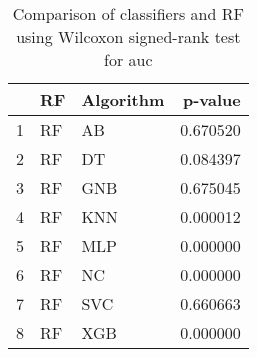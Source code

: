 \begin{table}
\footnotesize
\caption{Comparison of classifiers and RF using Wilcoxon signed-rank test for auc}
\label{tab:RF wilcoxon AUC comparison}
\begin{tabular}{lllr}
\hline
 & RF & Algorithm & p-value \\
\hline
1 & RF & AB & 0.670520 \\
2 & RF & DT & 0.084397 \\
3 & RF & GNB & 0.675045 \\
4 & RF & KNN & 0.000012 \\
5 & RF & MLP & 0.000000 \\
6 & RF & NC & 0.000000 \\
7 & RF & SVC & 0.660663 \\
8 & RF & XGB & 0.000000 \\
\hline
\end{tabular}
\end{table}
